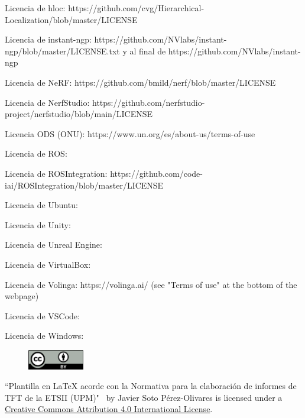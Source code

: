 \documentclass[a4paper, 12pt, spanish, twoside]{article}
\begin{document}
Licencia de hloc: https://github.com/cvg/Hierarchical-Localization/blob/master/LICENSE

Licencia de instant-ngp: https://github.com/NVlabs/instant-ngp/blob/master/LICENSE.txt y al final de https://github.com/NVlabs/instant-ngp

Licencia de NeRF: https://github.com/bmild/nerf/blob/master/LICENSE

Licencia de NerfStudio: https://github.com/nerfstudio-project/nerfstudio/blob/main/LICENSE

Licencia ODS (ONU): https://www.un.org/es/about-us/terms-of-use

Licencia de ROS: 

Licencia de ROSIntegration: https://github.com/code-iai/ROSIntegration/blob/master/LICENSE

Licencia de Ubuntu: 

Licencia de Unity: 

Licencia de Unreal Engine: 

Licencia de VirtualBox: 

Licencia de Volinga: https://volinga.ai/ (see "Terms of use" at the bottom of the webpage)

Licencia de VSCode: 

Licencia de Windows: 

\begin{figure}
    \vspace{-\baselineskip}
    \href{http://creativecommons.org/licenses/by/4.0/}{\includegraphics[width=0.22\textwidth]{licencias/cc-by.png}}
\end{figure} 

``Plantilla en LaTeX acorde con la Normativa para la elaboración de informes de TFT de la ETSII (UPM)" \ by Javier Soto Pérez-Olivares is licensed under a \href{http://creativecommons.org/licenses/by/4.0/}{Creative Commons Attribution 4.0 International License}.

\clearpage



\end{document}
